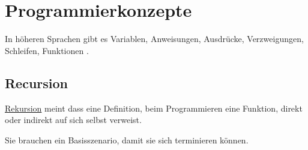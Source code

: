 \documentclass{article}
\begin{document}
\section{Programmierkonzepte} 
In höheren Sprachen gibt es Variablen, Anweisungen, Ausdrücke, Verzweigungen, Schleifen, Funktionen \etc.

\subsection{Recursion} \label{sec:rekursion}
\hyperref[sec:rekursion]{Rekursion} meint dass eine Definition, beim Programmieren \idr eine Funktion, direkt oder indirekt auf sich selbst verweist.

Sie brauchen ein Basisszenario, damit sie sich terminieren können.
\end{document}
